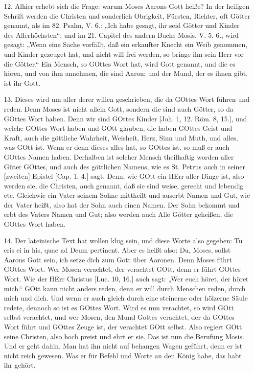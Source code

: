 12. Alhier erhebt sich die Frage: warum Moses Aarons Gott heiße? In der heiligen Schrift werden die Christen und sonderlich Obrigkeit, Fürsten, Richter, oft Götter genannt, als im 82. Psalm, V. 6.: „Ich habe gesagt, ihr seid Götter und Kinder des Allerhöchsten“; und im 21. Capitel des andern Buchs Mosis, V. 5. 6., wird gesagt: „Wenn eine Sache vorfällt, daß ein erkaufter Knecht ein Weib genommen, und Kinder gezeuget hat, und nicht will frei werden, so bringe ihn sein Herr vor die Götter.“ Ein Mensch, so GOttes Wort hat, wird Gott genannt, und die es hören, und von ihm annehmen, die sind Aaron; und der Mund, der es ihnen gibt, ist ihr Gott.

13. Dieses wird um aller derer willen geschrieben, die da GOttes Wort führen und reden. Denn Moses ist nicht allein Gott, sondern die sind auch Götter, so da GOttes Wort haben. Denn wir sind GOttes Kinder [Joh. 1, 12. Röm. 8, 15.], und welche GOttes Wort haben und GOtt glauben, die haben GOttes Geist und Kraft, auch die göttliche Wahrheit, Weisheit, Herz, Sinn und Muth, und alles, was GOtt ist. Wenn er denn dieses alles hat, so GOttes ist, so muß er auch GOttes Namen haben. Derhalben ist solcher Mensch theilhaftig worden aller Güter GOttes, und auch des göttlichen Namens, wie es St. Petrus auch in seiner [zweiten] Epistel [Cap. 1, 4.] sagt. Denn, wie GOtt ein HErr aller Dinge ist, also werden sie, die Christen, auch genannt, daß sie sind weise, gerecht und lebendig etc. Gleichwie ein Vater seinem Sohne mittheilt und auserbt Namen und Gut, wie der Vater heißt, also hat der Sohn auch einen Namen. Der Sohn bekommt und erbt des Vaters Namen und Gut; also werden auch Alle Götter geheißen, die GOttes Wort haben.

14. Der lateinische Text hat wollen klug sein, und diese Worte also gegeben: Tu eris ei in his, quae ad Deum pertinent. Aber es heißt also: Du, Moses, sollst Aarons Gott sein, ich setze dich zum Gott über Aaronen. Denn Moses führt GOttes Wort. Wer Mosen verachtet, der verachtet GOtt, denn er führt GOttes Wort. Wie der HErr Christus [Luc. 10, 16.] auch sagt: „Wer euch höret, der höret mich.“ GOtt kann nicht anders reden, denn er will durch Menschen reden, durch mich und dich. Und wenn er auch gleich durch eine steinerne oder hölzerne Säule redete, dennoch so ist es GOttes Wort. Wird es nun verachtet, so wird GOtt selbst verachtet, und wer Mosen, den Mund Gottes verachtet, der da GOttes Wort führt und GOttes Zeuge ist, der verachtet GOtt selbst. Also regiert GOtt seine Christen, also hoch preist und ehrt er sie. Das ist nun die Berufung Mosis. Und er geht dahin. Man hat ihn nicht auf behangen Wagen geführt, denn er ist nicht reich gewesen. Was er für Befehl und Worte an den König habe, das habt ihr gehört.

